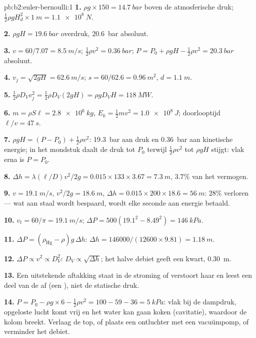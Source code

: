 \begin{solution}{pb:b2:euler-bernoulli:1}
\textbf{1.} $\rho g \times 150 = \qty{14.7}{bar}$ boven de atmosferische
druk; $\tfrac12\rho gH_d^2
\times \qty{1}{m} = \qty{1.1e8}{N}$.

\textbf{2.} $\rho gH = \qty{19.6}{bar}$ overdruk, \qty{20.6}{bar} absoluut.

\textbf{3.} $v = 60/7.07 = \qty{8.5}{m/s}$;
$\tfrac12\rho v^2 = \qty{0.36}{bar}$;
$P =
P_0 + \rho gH - \tfrac12\rho v^2 = \qty{20.3}{bar}$ absoluut.

\textbf{4.} $v_j = \sqrt{2gH} = \qty{62.6}{m/s}$;
$s = 60/62.6 = \qty{0.96}{m^2}$, $d =
\qty{1.1}{m}$.

\textbf{5.}
$\tfrac12\rho D_Vv_j^2 = \tfrac12\rho D_V(2gH) = \rho gD_VH = \qty{118}{MW}$.

\textbf{6.} $m = \rho S\ell = \qty{2.8e6}{kg}$,
$E_k = \tfrac12mv^2 = \qty{1.0e8}{J}$; doorlooptijd $\ell/v = \qty{47}{s}$.

\textbf{7.} $\rho gH = (P - P_0) + \tfrac12\rho v^2$: \qty{19.3}{bar} aan
druk en \qty{0.36}{bar} aan kinetische energie; in het mondstuk daalt de
druk tot $P_0$ terwijl $\tfrac12\rho v^2$ tot $\rho gH$ stijgt: vlak erna is
$P = P_0$.

\textbf{8.}
$\Delta h = \lambda(\ell/D)v^2/2g = 0.015 \times 133 \times 3.67 = \qty{7.3}{m}$,
$3.7\%$ van het vermogen.

\textbf{9.} $v = \qty{19.1}{m/s}$, $v^2/2g = \qty{18.6}{m}$,
$\Delta h = 0.015 \times 200 \times
18.6 = \qty{56}{m}$: $28\%$ verloren ---
wat aan staal wordt bespaard, wordt elke seconde aan energie betaald.

\textbf{10.} $v_t = 60/\pi = \qty{19.1}{m/s}$;
$\Delta P = 500(19.1^2 - 8.49^2) =
\qty{146}{kPa}$.

\textbf{11.} $\Delta P = (\rho_{\text{Hg}} - \rho)g\,\Delta h$:
$\Delta h = 146000/(12600
\times 9.81) = \qty{1.18}{m}$.

\textbf{12.} $\Delta P \propto v^2 \propto D_V^2$:
$D_V \propto \sqrt{\Delta h}$; het halve debiet geeft een kwart,
\qty{0.30}{m}.

\textbf{13.} Een uitstekende aftakking staat in de stroming of verstoort
haar en leest een deel van de  af (een ), niet de
statische druk.

\textbf{14.}
$P = P_0 - \rho g \times 6 - \tfrac12\rho v^2 = 100 - 59 - 36 = \qty{5}{kPa}$:
vlak bij de dampdruk, opgeloste lucht komt vrij en het water kan gaan koken
(cavitatie), waardoor de kolom breekt. Verlaag de top, of plaats een
ontluchter met een vacuümpomp, of verminder het debiet.


\end{solution}
